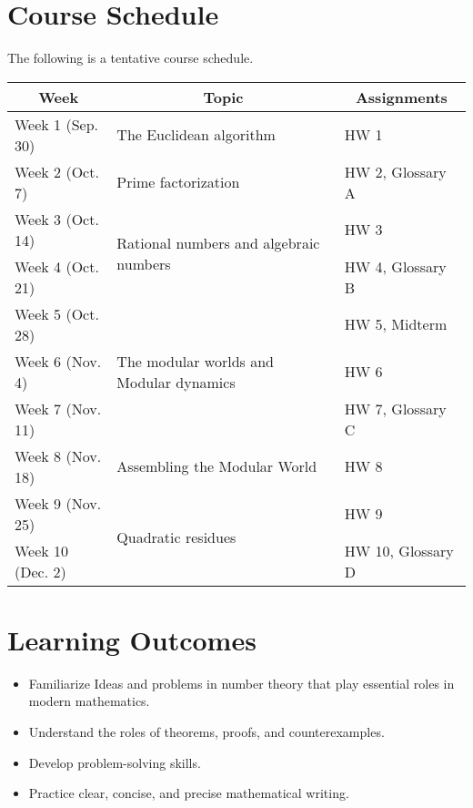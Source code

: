 \documentclass[12pt]{article}
\begin{document}
\section{Course Schedule} 
The following is a tentative course schedule. 
\begin{center}
	\begin{tabular}{l|m{}|l}
		\hline
		\multicolumn{1}{c}{\textsf{Week}} & \multicolumn{1}{c}{\textsf{Topic}} & \multicolumn{1}{c}{\textsf{Assignments}} \\
		\hline
		Week 1 (Sep. 30) & The Euclidean algorithm & HW 1 \\
		\hline
		Week 2 (Oct. 7) & Prime factorization & HW 2, Glossary A \\
		\hline
		Week 3 (Oct. 14) & \multirow{2}{0.4\textwidth}{Rational numbers and algebraic numbers} & HW 3 \\
		\cline{1-1}\cline{3-3}
		Week 4 (Oct. 21) & & HW 4, Glossary B \\
		\hline
		Week 5 (Oct. 28) & \multirow{3}{0.4\textwidth}{The modular worlds and Modular dynamics} & HW 5, Midterm \\
		\cline{1-1}\cline{3-3}
		Week 6 (Nov. 4) & & HW 6 \\
		\cline{1-1}\cline{3-3}
		Week 7 (Nov. 11) & & HW 7, Glossary C \\
		\hline
		Week 8 (Nov. 18) & Assembling the Modular World & HW 8 \\
		\hline
		Week 9 (Nov. 25) & \multirow{2}{0.4\textwidth}{Quadratic residues} & HW 9 \\
		\cline{1-1}\cline{3-3}
		Week 10 (Dec. 2) & & HW 10, Glossary D \\
		\hline
	\end{tabular}
\end{center}

\section{Learning Outcomes}
\begin{itemize}
	\item Familiarize Ideas and problems in number theory that play essential roles in modern mathematics.
	\item Understand the roles of theorems, proofs, and counterexamples. 
	\item Develop problem-solving skills.
	\item Practice clear, concise, and precise mathematical writing.
\end{itemize}	
\end{document}
